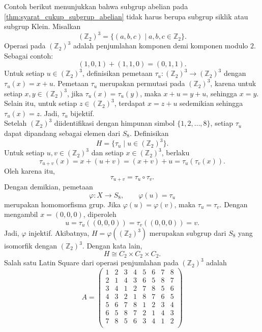 \begin{contoh}\label{contoh:syarat_cukup_subgrup_abelian_ordo_8}
  Contoh berikut menunjukkan bahwa subgrup abelian pada
  \autoref{thm:syarat_cukup_subgrup_abelian} tidak harus berupa subgrup
  siklik atau subgrup Klein. Misalkan
  \[
    (\mathbb{Z}_2)^3
    =
    \{(a,b,c)\mid a,b,c\in\mathbb{Z}_2\}.
  \]
  Operasi pada $(\mathbb{Z}_2)^3$ adalah penjumlahan komponen demi komponen modulo $2$.
  Sebagai contoh:
  \[
    (1,0,1)+(1,1,0)=(0,1,1).
  \]
  Untuk setiap $u\in (\mathbb{Z}_2)^3$, definisikan pemetaan
  $\tau_u:(\mathbb{Z}_2)^3\to (\mathbb{Z}_2)^3$ dengan $\tau_u(x)=x+u$. Pemetaan $\tau_u$ merupakan
  permutasi pada $(\mathbb{Z}_2)^3$, karena untuk setiap $x,y\in (\mathbb{Z}_2)^3$, jika
  $\tau_u(x)=\tau_u(y)$, maka $x+u=y+u$, sehingga $x=y$. Selain itu,
  untuk setiap $z\in (\mathbb{Z}_2)^3$, terdapat $x=z+u$ sedemikian sehingga
  $\tau_u(x)=z$. Jadi, $\tau_u$ bijektif.\\
  Setelah $(\mathbb{Z}_2)^3$ diidentifikasi dengan himpunan simbol $\{1,2,\ldots,8\}$,
  setiap $\tau_u$ dapat dipandang sebagai elemen dari $S_8$. Definisikan
  \[
    H=\{\tau_u\mid u\in (\mathbb{Z}_2)^3\}.
  \]
  Untuk setiap $u,v\in (\mathbb{Z}_2)^3$ dan setiap $x\in (\mathbb{Z}_2)^3$, berlaku
  \[
    \tau_{u+v}(x)
    =
    x+(u+v)
    =
    (x+v)+u
    =
    \tau_u(\tau_v(x)).
  \]
  Oleh karena itu,
  \[
    \tau_{u+v}=\tau_u\circ\tau_v.
  \]
  Dengan demikian, pemetaan
  \[
    \varphi:X\to S_8,\qquad \varphi(u)=\tau_u
  \]
  merupakan homomorfisma grup. Jika $\varphi(u)=\varphi(v)$, maka
  $\tau_u=\tau_v$. Dengan mengambil $x=(0,0,0)$, diperoleh
  \[
    u=\tau_u((0,0,0))=\tau_v((0,0,0))=v.
  \]
  Jadi, $\varphi$ injektif. Akibatnya, $H=\varphi((\mathbb{Z}_2)^3)$ merupakan subgrup
  dari $S_8$ yang isomorfik dengan $(\mathbb{Z}_2)^3$. Dengan kata lain,
  \[
    H\cong C_2\times C_2\times C_2.
  \]
  Salah satu Latin Square dari operasi penjumlahan pada $(\mathbb{Z}_2)^3$ adalah
  \[
    A=
    \begin{pmatrix}
      1 & 2 & 3 & 4 & 5 & 6 & 7 & 8 \\
      2 & 1 & 4 & 3 & 6 & 5 & 8 & 7 \\
      3 & 4 & 1 & 2 & 7 & 8 & 5 & 6 \\
      4 & 3 & 2 & 1 & 8 & 7 & 6 & 5 \\
      5 & 6 & 7 & 8 & 1 & 2 & 3 & 4 \\
      6 & 5 & 8 & 7 & 2 & 1 & 4 & 3 \\
      7 & 8 & 5 & 6 & 3 & 4 & 1 & 2 \\

\end{pmatrix}\]
\end{contoh}
